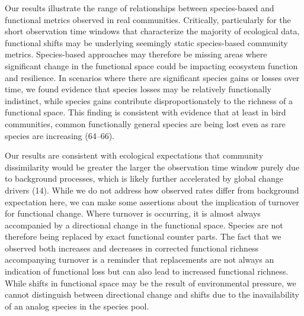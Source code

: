 \documentclass{article}
\begin{document}
Our results illustrate the range of relationships between species-based
and functional metrics observed in real communities. Critically,
particularly for the short observation time windows that characterize
the majority of ecological data, functional shifts may be underlying
seemingly static species-based community metrics. Species-based
approaches may therefore be missing areas where significant change in
the functional space could be impacting ecosystem function and
resilience. In scenarios where there are significant species gains or
losses over time, we found evidence that species losses may be
relatively functionally indistinct, while species gains contribute
disproportionately to the richness of a functional space. This finding
is consistent with evidence that at least in bird communities, common
functionally general species are being lost even as rare species are
increasing (64--66).

Our results are consistent with ecological expectations that community
dissimilarity would be greater the larger the observation time window
purely due to background processes, which is likely further accelerated
by global change drivers (14). While we do not address how observed
rates differ from background expectation here, we can make some
assertions about the implication of turnover for functional change.
Where turnover is occurring, it is almost always accompanied by a
directional change in the functional space. Species are not therefore
being replaced by exact functional counter parts. The fact that we
observed both increases and decreases in corrected functional richness
accompanying turnover is a reminder that replacements are not always an
indication of functional loss but can also lead to increased functional
richness. While shifts in functional space may be the result of
environmental pressure, we cannot distinguish between directional change
and shifts due to the inavailability of an analog species in the species
pool.
\end{document}
